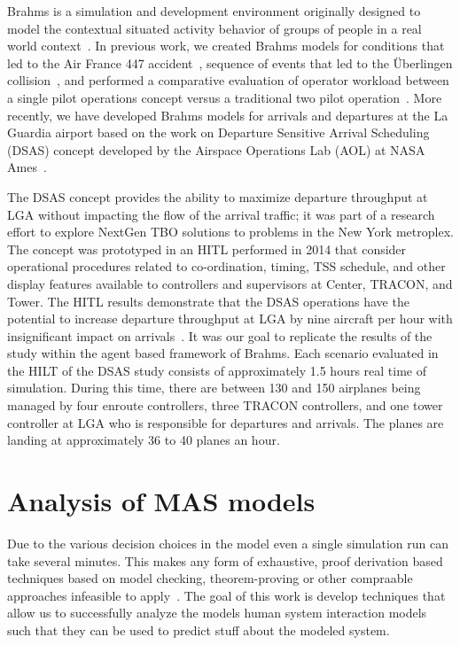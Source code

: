 \documentclass[12pt]{article}
\begin{document}
Brahms is a simulation and development environment originally designed
to model the contextual situated activity behavior of groups of people
in a real world context~\cite{clancey1998brahms,SierhuisPhD}. In previous work, we created Brahms models for conditions that led to the Air France 447 accident~\cite{hunter:aamas13}, sequence of events that led to the \"{U}berlingen collision~\cite{Rungta:2013}, and performed a comparative evaluation of operator workload between a single pilot operations concept versus a traditional two pilot operation~\cite{Stocker:2015}. More recently, we have developed Brahms models for arrivals and departures at the La Guardia airport based on the work on Departure Sensitive Arrival Scheduling (DSAS) concept developed by the Airspace Operations Lab (AOL) at NASA Ames~\cite{dsas}. 

The DSAS concept provides the ability to maximize departure throughput at LGA without impacting the flow of the arrival traffic; it was part of a research effort to explore NextGen TBO solutions to problems in the New York metroplex. The concept was prototyped in an HITL performed in 2014 that consider operational procedures related to co-ordination, timing, TSS schedule, and other display features available to controllers and supervisors at Center, TRACON, and Tower. The HITL results demonstrate that the DSAS operations have the potential to increase departure throughput at LGA by nine aircraft per hour with insignificant impact on arrivals~\cite{dsas}.  It was our goal to replicate the results of the study within the agent based framework of Brahms. Each scenario evaluated in the HILT of the DSAS study consists of approximately 1.5 hours real time of simulation. During this time, there are between 130 and 150 airplanes being managed by four enroute controllers, three TRACON controllers, and one tower controller at LGA who is responsible for departures and arrivals. The planes are landing at approximately 36 to 40 planes an hour.

\section{Analysis of MAS models} 
Due to the various decision choices in the model even a single simulation run can take several minutes. This makes any form of exhaustive, proof derivation based techniques based on model checking, theorem-proving or other compraable approaches infeasible to apply~\cite{hunter:aamas13,raimondi:aamas14}. The goal of this work is develop techniques that allow us to successfully analyze the models human system interaction models such that they can be used to predict stuff about the modeled system. 
\end{document}
